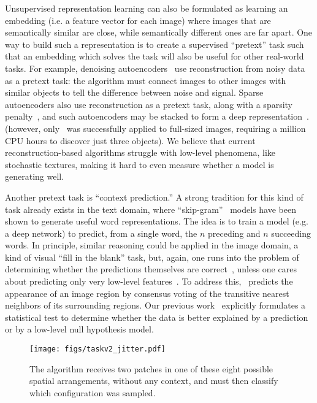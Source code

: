 \documentclass[10pt,twocolumn,letterpaper]{article}
\begin{document}
Unsupervised representation learning can also be formulated as learning an embedding (i.e. a feature vector for each image) where images that are semantically similar are close, while semantically different ones are far apart. 
One way to build such a representation is to create a supervised ``pretext'' task such that an embedding which solves the task will also be useful for other real-world tasks.  For example, denoising autoencoders~\cite{vincent2008extracting,bengio2013deep} use reconstruction from noisy data as a pretext task: the algorithm must connect images to other images with similar objects to tell the difference between noise and signal. Sparse autoencoders also use reconstruction as a pretext task, along with a sparsity penalty~\cite{olshausen1996emergence}, and such autoencoders may be stacked to form a deep representation~\cite{lee2006efficient,le2013building}. 
(however, only~\cite{le2013building} was successfully applied to full-sized images, requiring a million CPU hours to discover just three objects). 
We believe that current reconstruction-based algorithms struggle with low-level phenomena, like stochastic textures, making it hard to even measure whether a model is generating well.  







Another pretext task is ``context prediction.''
A strong tradition for this kind of task already exists in the text domain, where ``skip-gram''~\cite{mikolov2013distributed} models have been shown to generate useful word representations.  The idea is to train a model (e.g. a deep network) to predict, from a single word, the $n$ preceding and $n$ succeeding words.  In principle, similar reasoning could be applied in the image domain, a kind of visual ``fill in the blank'' task, but, again, one runs into the problem of determining whether the predictions themselves are correct~\cite{doersch2014context},
unless one cares about predicting only very low-level features~\cite{domke2008killed,larochelle2011neural,theis2015generative}.
To address this,~\cite{malisiewicz2009beyond} predicts the appearance of an image region by consensus voting of the transitive nearest neighbors of its surrounding regions. Our previous work~\cite{doersch2014context} explicitly formulates a statistical test to determine whether 
the data is better explained by a prediction or by a low-level null hypothesis model. 




\begin{figure}[t]
\begin{center}
   \texttt{[image: figs/taskv2\_jitter.pdf]}
   \vspace{-.2cm}
\end{center}
   \caption{The algorithm receives two patches in one of these eight possible spatial arrangements, without any context, and must then classify which configuration was sampled. }
   \vspace{-.2in}
\label{fig:task}
\end{figure}
\end{document}

